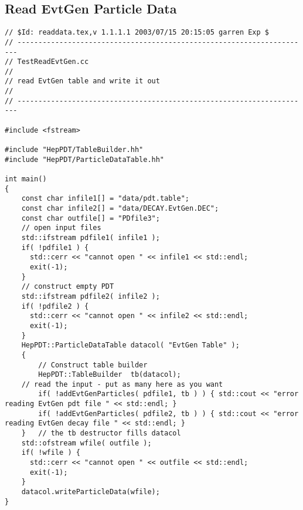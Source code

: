 \subsection { Read EvtGen Particle Data }
\begin{verbatim}
// $Id: readdata.tex,v 1.1.1.1 2003/07/15 20:15:05 garren Exp $
// ----------------------------------------------------------------------
// TestReadEvtGen.cc
//
// read EvtGen table and write it out
//
// ----------------------------------------------------------------------

#include <fstream>

#include "HepPDT/TableBuilder.hh"
#include "HepPDT/ParticleDataTable.hh"

int main()
{
    const char infile1[] = "data/pdt.table";
    const char infile2[] = "data/DECAY.EvtGen.DEC";
    const char outfile[] = "PDfile3";
    // open input files
    std::ifstream pdfile1( infile1 );
    if( !pdfile1 ) { 
      std::cerr << "cannot open " << infile1 << std::endl;
      exit(-1);
    }
    // construct empty PDT
    std::ifstream pdfile2( infile2 );
    if( !pdfile2 ) { 
      std::cerr << "cannot open " << infile2 << std::endl;
      exit(-1);
    }
    HepPDT::ParticleDataTable datacol( "EvtGen Table" );
    {
        // Construct table builder
        HepPDT::TableBuilder  tb(datacol);
	// read the input - put as many here as you want
        if( !addEvtGenParticles( pdfile1, tb ) ) { std::cout << "error reading EvtGen pdt file " << std::endl; }
        if( !addEvtGenParticles( pdfile2, tb ) ) { std::cout << "error reading EvtGen decay file " << std::endl; }
    }	// the tb destructor fills datacol
    std::ofstream wfile( outfile );
    if( !wfile ) { 
      std::cerr << "cannot open " << outfile << std::endl;
      exit(-1);
    }
    datacol.writeParticleData(wfile);
}
\end{verbatim}

